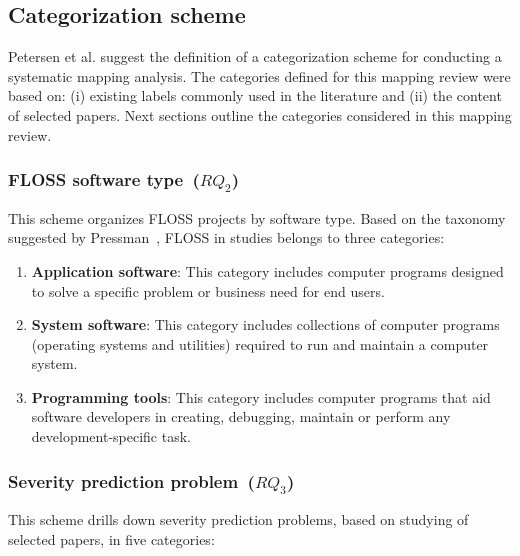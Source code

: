 \subsection{Categorization scheme}\label{subsec:categorization}
Petersen et al.\cite{Petersen:2008} suggest the definition of a categorization scheme for conducting a systematic mapping analysis. The categories defined for this mapping review were based on: (i) existing labels commonly used in the literature and (ii) the content of selected papers. Next sections outline the categories considered in this mapping review.

\subsubsection{FLOSS software type~($RQ_{2}$)}
This scheme organizes FLOSS projects by software type. Based on the taxonomy suggested by Pressman~\cite{Pressman:2009}, FLOSS in studies belongs to three categories: 

\begin{enumerate}[label=\alph*., leftmargin=1.2cm]
  \item \textbf{Application software}: This category includes computer programs designed to solve a specific problem or business need for end users. 
  \item \textbf{System software}: This category includes collections of computer programs (operating systems and utilities) required to run and maintain a computer system.
  \item \textbf{Programming tools}: This category includes computer programs that aid software developers in creating, debugging, maintain or perform any development-specific task.
\end{enumerate}

\subsubsection{Severity prediction problem~($RQ_{3}$)}
This scheme drills down severity prediction problems, based on studying of selected papers, in five categories:

